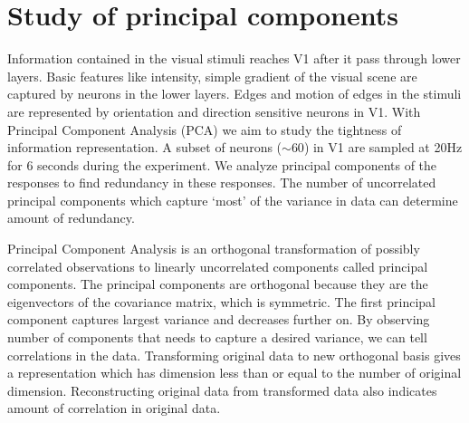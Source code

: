 \documentclass[MTech]{iitmdiss}
\begin{document}
\section{Study of principal components} %
\label{sec:study_of_correlation}
Information contained in the visual stimuli reaches V1 after it pass through lower layers. Basic features like intensity, simple gradient of the visual scene are captured by neurons in the lower layers. Edges and motion of edges in the stimuli are represented by orientation and direction sensitive neurons in V1. With Principal Component Analysis (PCA) we aim to study the tightness of information representation. A subset of neurons ($\sim 60$) in V1 are sampled at 20Hz for 6 seconds during the experiment. We analyze principal components of the responses to find redundancy in these responses. The number of uncorrelated principal components which capture `most' of the variance in data can determine amount of redundancy.

Principal Component Analysis is an orthogonal transformation of possibly correlated observations to linearly uncorrelated components called principal components.  The principal components are orthogonal because they are the eigenvectors of the covariance matrix, which is symmetric. The first principal component captures largest variance and decreases further on. By observing number of components that needs to capture a desired variance, we can tell correlations in the data. Transforming original data to new orthogonal basis gives a representation which has dimension less than or equal to the number of original dimension. Reconstructing original data from transformed data also indicates amount of correlation in original data.
\end{document}
